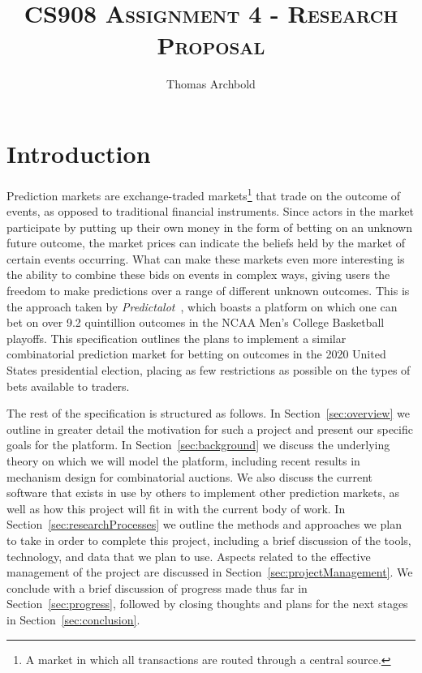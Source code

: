 \documentclass[10pt,a4paper]{article}
\title{\textsc{CS908 Assignment 4 - Research Proposal}}
\author{Thomas Archbold}
\date{}
\theoremstyle{plain}
\theoremstyle{definition}
\begin{document}
\maketitle



\section{Introduction}

	Prediction markets are exchange-traded markets\footnote{A market in which
	all transactions are routed through a central source.} that trade on the
	outcome of events, as opposed to traditional financial instruments. Since
	actors in the market participate by putting up their own money in the form
	of betting on an unknown future outcome, the market prices can indicate the
	beliefs held by the market of certain events occurring. What can make these
	markets even more interesting is the ability to combine these bids on
	events in complex ways, giving users the freedom to make predictions over a
	range of different unknown outcomes. This is the approach taken by
	\emph{Predictalot}~\cite{Predictalot}, which boasts a platform on which one
	can bet on over 9.2 quintillion outcomes in the NCAA Men's College
	Basketball playoffs. This specification outlines the plans to implement a
	similar combinatorial prediction market for betting on outcomes in the 2020
	United States presidential election, placing as few restrictions as
	possible on the types of bets available to traders.

	The rest of the specification is structured as follows. In
	Section~\ref{sec:overview} we outline in greater detail the motivation for
	such a project and present our specific goals for the platform. In
	Section~\ref{sec:background} we discuss the underlying theory on which we
	will model the platform, including recent results in mechanism design for
	combinatorial auctions. We also discuss the current software that exists in
	use by others to implement other prediction markets, as well as how this
	project will fit in with the current body of work. In
	Section~\ref{sec:researchProcesses} we outline the methods and approaches
	we plan to take in order to complete this project, including a brief
	discussion of the tools, technology, and data that we plan to use. Aspects
	related to the effective management of the project are discussed in
	Section~\ref{sec:projectManagement}. We conclude with a brief discussion of
	progress made thus far in Section~\ref{sec:progress}, followed by closing
	thoughts and plans for the next stages in Section~\ref{sec:conclusion}.
\end{document}

